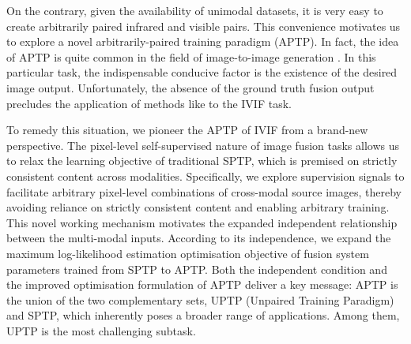On the contrary, given the availability of unimodal datasets, it is very easy to create arbitrarily paired infrared and visible pairs.
This convenience motivates us to explore a novel arbitrarily-paired training paradigm (APTP).
In fact, the idea of APTP is quite common in the field of image-to-image generation \cite{cyclegan, unpaired_1, unpaired_2, unpaired_3, unpaired_4, theorm_unpaired}. 
In this particular task, the indispensable conducive factor is the existence of the desired image output. 
Unfortunately, the absence of the ground truth fusion output precludes the application of methods like \cite{cyclegan} to the IVIF task.


To remedy this situation, we pioneer the APTP of IVIF from a brand-new perspective. 
The pixel-level self-supervised nature of image fusion tasks allows us to relax the learning objective of traditional SPTP, 
which is premised on strictly consistent content across modalities. 
Specifically, we explore supervision signals to facilitate arbitrary pixel-level combinations of cross-modal source images, thereby avoiding reliance on strictly consistent content and enabling arbitrary training.
This novel working mechanism motivates the expanded independent relationship between the multi-modal inputs.  
According to its independence, we expand the maximum log-likelihood estimation optimisation objective of fusion system parameters trained from SPTP to APTP. 
Both the independent condition and the improved optimisation formulation of APTP deliver a key message: APTP is the union of the two complementary sets, UPTP (Unpaired Training Paradigm) and SPTP, which inherently poses a broader range of applications. 
Among them, UPTP is the most challenging subtask. 

